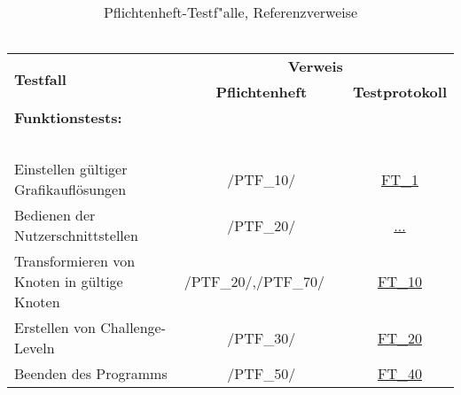 \begin{longtable}{p{0.5\hsize}p{0.275\hsize}p{0.275\hsize}}

	\caption{Pflichtenheft-Testf{"a}lle, Referenzverweise\\~\\}
	\label{Pflichtenheft:Tests:Referenzverweise}
	\\


	    \multirow{2}{*}{\textbf{Testfall}}
	  & \multicolumn{2}{c}{\textbf{Verweis}}
	  
	  \\ [14pt]
	  
	  & \multicolumn{1}{c}{\textbf{Pflichtenheft}}
	  & \multicolumn{1}{c}{\textbf{Testprotokoll}}
	  
	  \\ 
	     


	  \multicolumn{3}{l}{\textbf{Funktionstests:}}
	  
	\\
	
	  \multicolumn{3}{l}{~}
	  
	\\

	  \multicolumn{1}{L{6.5cm}}{Einstellen gültiger Grafikauflösungen}
	& \multicolumn{1}{c}{/PTF\_10/}
	& \multicolumn{1}{c}{\hyperref[FT:1]{FT\_1}}
	
	\\
	
	
	  \multicolumn{1}{L{6.5cm}}{Bedienen der Nutzerschnittstellen}
	& \multicolumn{1}{c}{/PTF\_20/}
	& \multicolumn{1}{c}{\hyperref[]{...}}
		
	\\

	  \multicolumn{1}{L{6.5cm}}{Transformieren von Knoten in gültige Knoten}
	& \multicolumn{1}{C{3cm}}{/PTF\_20/,\newline/PTF\_70/~~}
	& \multicolumn{1}{c}{\hyperref[FT:10]{FT\_10}}
	
	\\
	
	 \multicolumn{1}{L{6.5cm}}{Erstellen von Challenge-Leveln}
	& \multicolumn{1}{c}{/PTF\_30/}
	& \multicolumn{1}{c}{\hyperref[FT::20]{FT\_20}}
	
	\\
	
	  \multicolumn{1}{L{6.5cm}}{Beenden des Programms}
	& \multicolumn{1}{c}{/PTF\_50/}
	& \multicolumn{1}{c}{\hyperref[FT::40]{FT\_40}}
	

\end{longtable}
